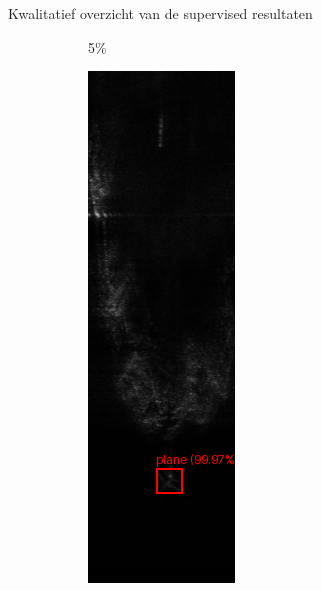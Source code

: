 \documentclass[aspectratio=169]{beamer}
\begin{document}
\begin{frame}{Kwalitatief overzicht van de supervised resultaten}
\begin{figure}
\begin{subfigure}{.15\textwidth}
                \caption[Voorspelling Faster R-CNN 5\%]{5\%}
            \end{subfigure}%
            \hfill
            \begin{subfigure}{.15\textwidth}
                \centering
                \captionsetup{justification=centering}
                \includegraphics[width=0.9\linewidth]{251_faster_rcnn_50pct.png}

\end{subfigure}
\end{figure}
\end{frame}
\end{document}
